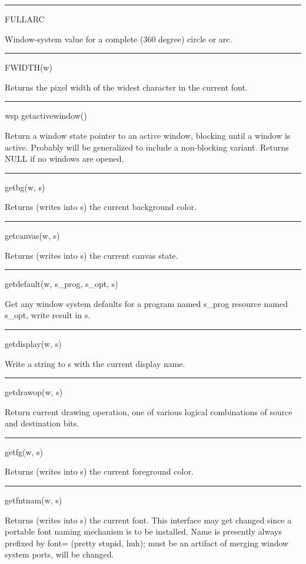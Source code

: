 \bigskip\hrule\vspace{0.1cm}
\noindent
FULLARC


Window-system value for a complete (360 degree) circle or arc.


\bigskip\hrule\vspace{0.1cm}
\noindent
FWIDTH(w)


Returns the pixel width of the widest character in the current font.


\bigskip\hrule\vspace{0.1cm}
\noindent
wsp getactivewindow()


Return a window state pointer to an active window, blocking until a
window is active. Probably will be generalized to include a
non-blocking variant. Returns \textsf{NULL} if no windows are opened.


\bigskip\hrule\vspace{0.1cm}
\noindent
getbg(w, s)


Returns (writes into \textsf{s}) the current background color.


\bigskip\hrule\vspace{0.1cm}
\noindent
getcanvas(w, s)


Returns (writes into \textsf{s}) the current canvas state.


\bigskip\hrule\vspace{0.1cm}
\noindent
getdefault(w, s\_prog, s\_opt, s)


Get any window system defaults for a program named s\_prog resource
named s\_opt, write result in s.


\bigskip\hrule\vspace{0.1cm}
\noindent
getdisplay(w, s)


Write a string to s with the current display name.


\bigskip\hrule\vspace{0.1cm}
\noindent
getdrawop(w, s)


Return current drawing operation, one of various logical combinations
of source and destination bits.


\bigskip\hrule\vspace{0.1cm}
\noindent
getfg(w, s)


Returns (writes into s) the current foreground color.


\bigskip\hrule\vspace{0.1cm}
\noindent
getfntnam(w, s)


Returns (writes into s) the current font. This interface may get
changed since a portable font naming mechanism is to be
installed. Name is presently always prefixed by
{\textquotedbl}font={\textquotedbl} (pretty stupid, huh); must be an
artifact of merging window system ports, will be changed.



